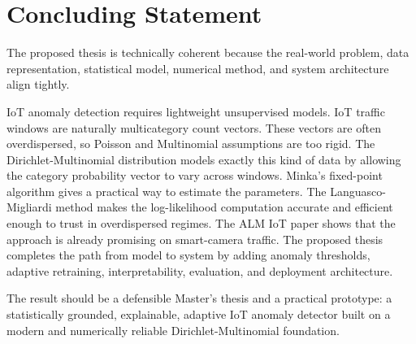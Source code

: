 \documentclass[11pt,a4paper]{article}
\begin{document}
\section*{Concluding Statement}

The proposed thesis is technically coherent because the real-world problem, data representation, statistical model, numerical method, and system architecture align tightly.

IoT anomaly detection requires lightweight unsupervised models. IoT traffic windows are naturally multicategory count vectors. These vectors are often overdispersed, so Poisson and Multinomial assumptions are too rigid. The Dirichlet-Multinomial distribution models exactly this kind of data by allowing the category probability vector to vary across windows. Minka's fixed-point algorithm gives a practical way to estimate the parameters. The Languasco-Migliardi method makes the log-likelihood computation accurate and efficient enough to trust in overdispersed regimes. The ALM IoT paper shows that the approach is already promising on smart-camera traffic. The proposed thesis completes the path from model to system by adding anomaly thresholds, adaptive retraining, interpretability, evaluation, and deployment architecture.

The result should be a defensible Master's thesis and a practical prototype: a statistically grounded, explainable, adaptive IoT anomaly detector built on a modern and numerically reliable Dirichlet-Multinomial foundation.
\end{document}

